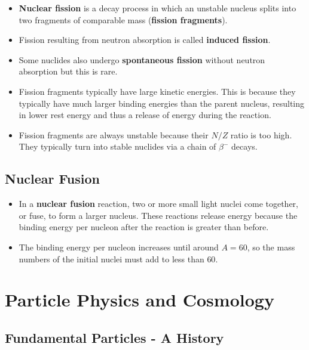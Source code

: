 \documentclass{article}
\begin{document}
\begin{itemize}
  \item \textbf{Nuclear fission} is a decay process in which an unstable nucleus splits into two fragments of comparable mass (\textbf{fission fragments}).

  \item Fission resulting from neutron absorption is called \textbf{induced fission}.

  \item Some nuclides also undergo \textbf{spontaneous fission} without neutron absorption but this is rare.

  \item Fission fragments typically have large kinetic energies. This is because they typically have much larger binding energies than the parent nucleus, resulting in lower rest energy and thus a release of energy during the reaction.

  \item Fission fragments are always unstable because their $N / Z$ ratio is too high. They typically turn into stable nuclides via a chain of $\beta^-$ decays.
\end{itemize}

\subsection{Nuclear Fusion}

\begin{itemize}
  \item In a \textbf{nuclear fusion} reaction, two or more small light nuclei come together, or fuse, to form a larger nucleus. These reactions release energy because the binding energy per nucleon after the reaction is greater than before.

  \item The binding energy per nucleon increases until around $A = 60$, so the mass numbers of the initial nuclei must add to less than $60$.
\end{itemize}

\section{Particle Physics and Cosmology}

\subsection{Fundamental Particles - A History}
\end{document}

